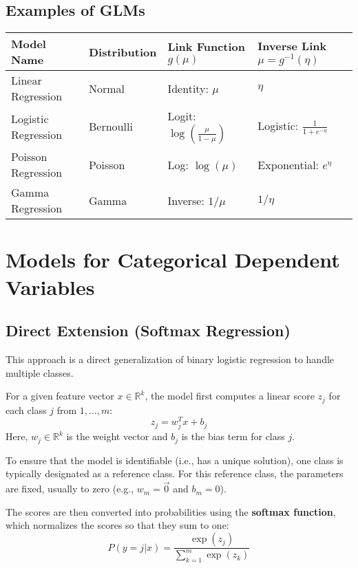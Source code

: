 \documentclass{article}
\begin{document}
\begin{multicols}{2}
	\subsection{Examples of GLMs}
	\begin{table}[h!]
		\centering
		\begin{tabular}{|l|l|l|l|}
			\hline
			\textbf{Model Name} & \textbf{Distribution} & \textbf{Link Function $g(\mu)$}  & \textbf{Inverse Link $\mu = g^{-1}(\eta)$} \\
			\hline
			Linear Regression   & Normal                & Identity: $\mu$                  & $\eta$                                     \\
			Logistic Regression & Bernoulli             & Logit: $\log(\frac{\mu}{1-\mu})$ & Logistic: $\frac{1}{1+e^{-\eta}}$          \\
			Poisson Regression  & Poisson               & Log: $\log(\mu)$                 & Exponential: $e^{\eta}$                    \\
			Gamma Regression    & Gamma                 & Inverse: $1/\mu$                 & $1/\eta$                                   \\
			\hline
		\end{tabular}
	\end{table}

	\section{Models for Categorical Dependent Variables}

	\subsection{Direct Extension (Softmax Regression)}
	This approach is a direct generalization of binary logistic regression to handle multiple classes.

	For a given feature vector $x \in \mathbb{R}^k$, the model first computes a linear score $z_j$ for each class $j$ from $1, \dots, m$:
	$$ z_j = w_j^T x + b_j $$
	Here, $w_j \in \mathbb{R}^k$ is the weight vector and $b_j$ is the bias term for class $j$.

	To ensure that the model is identifiable (i.e., has a unique solution), one class is typically designated as a reference class. For this reference class, the parameters are fixed, usually to zero (e.g., $w_m = \vec{0}$ and $b_m = 0$).

	The scores are then converted into probabilities using the \textbf{softmax function}, which normalizes the scores so that they sum to one:
	$$ P(y=j | x) = \frac{\exp(z_j)}{\sum_{k=1}^{m} \exp(z_k)} $$


\end{multicols}
\end{document}
